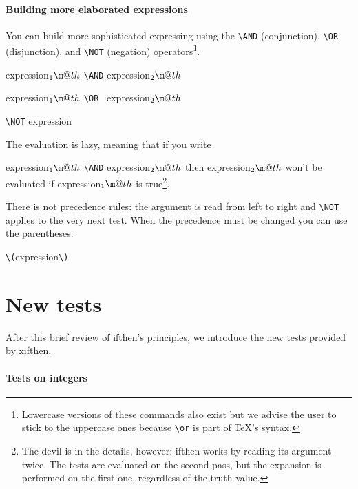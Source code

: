 \documentclass{article}
\makeatletter
\newcommand*{\cmd}[1]{\tex{\textbackslash #1}}
\newcommand*{\tex}{\texttt}
\newenvironment*{texcode}{\list{}{}\item\ttfamily}{\endlist}
\newcommand*{\meta}[1]{\textnormal{\textlangle#1\textrangle}}
\newcommand*{\1}{$_1\m@th$}
\newcommand*{\2}{$_2\m@th$}
\newcommand*{\pack}{\textsf}
\makeatother
\begin{document}
\paragraph{Building more elaborated expressions}

You can build more sophisticated expressing using the \cmd{AND}
(conjunction), \cmd{OR} (disjunction), and \cmd{NOT} (negation)
operators\footnote{Lowercase versions of these commands also exist but
  we advise the user to stick to the uppercase ones because \cmd{or}
  is part of \TeX's syntax.}.
%
\begin{list}{}{}
\item \meta{expression\1} \cmd{AND}  \meta{expression\2}
\item \meta{expression\1} \cmd{OR} \ \meta{expression\2}
\item \cmd{NOT} \meta{expression}
\end{list}
%
The evaluation is lazy, meaning that if you write
%
\begin{texcode}
\meta{expression\1} \cmd{AND} \meta{expression\2}
\end{texcode}
%
then \meta{expression\2} won't be evaluated if \meta{expression\1} is
true\footnote{The devil is in the details, however: \pack{ifthen} works by
  reading its argument twice.  The tests are evaluated on the second
  pass, but the expansion is performed on the first one, regardless of
  the truth value.}.

There is not precedence rules: the argument is read from left to right
and \cmd{NOT} applies to the very next test.  When the precedence must
be changed you can use the parentheses:
%
\begin{texcode}
\cmd{(}\meta{expression}\cmd{)}
\end{texcode}

\section{New tests}

After this brief review of \pack{ifthen}'s principles, we introduce
the new tests provided by \pack{xifthen}.

\paragraph{Tests on integers}
\end{document}
